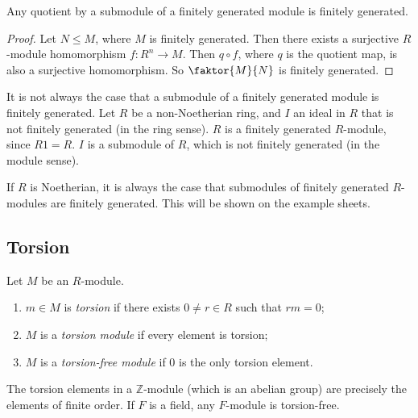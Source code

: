 \begin{corollary}
	Any quotient by a submodule of a finitely generated module is finitely generated.
\end{corollary}
\begin{proof}
	Let $N \leq M$, where $M$ is finitely generated.
	Then there exists a surjective $R$-module homomorphism $f : R^n \to M$.
	Then $q \circ f$, where $q$ is the quotient map, is also a surjective homomorphism.
	So $\faktor{M}{N}$ is finitely generated.
\end{proof}
\begin{example}
	It is not always the case that a submodule of a finitely generated module is finitely generated.
	Let $R$ be a non-Noetherian ring, and $I$ an ideal in $R$ that is not finitely generated (in the ring sense).
	$R$ is a finitely generated $R$-module, since $R1 = R$.
	$I$ is a submodule of $R$, which is not finitely generated (in the module sense).
\end{example}
\begin{remark}
	If $R$ is Noetherian, it is always the case that submodules of finitely generated $R$-modules are finitely generated.
	This will be shown on the example sheets.
\end{remark}

\subsection{Torsion}
\begin{definition}
	Let $M$ be an $R$-module.
	\begin{enumerate}
		\item $m \in M$ is \textit{torsion} if there exists $0 \neq r \in R$ such that $rm = 0$;
		\item $M$ is a \textit{torsion module} if every element is torsion;
		\item $M$ is a \textit{torsion-free module} if 0 is the only torsion element.
	\end{enumerate}
\end{definition}
\begin{example}
	The torsion elements in a $\mathbb Z$-module (which is an abelian group) are precisely the elements of finite order.
	If $F$ is a field, any $F$-module is torsion-free.
\end{example}

